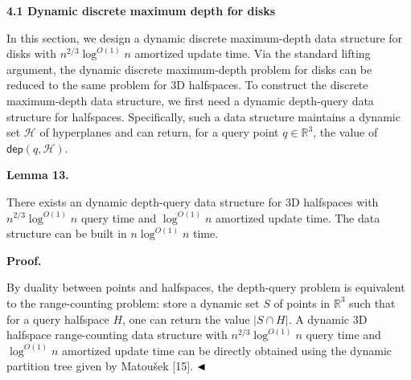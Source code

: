 \par
\par
\par\medskip\noindent\textbf{4.1 Dynamic discrete maximum depth for disks}\par
In this section, we design a dynamic discrete maximum-depth data structure for disks with $n^{2/3}\log^{O(1)}n$ amortized update time. Via the standard lifting argument, the dynamic discrete maximum-depth problem for disks can be reduced to the same problem for 3D halfspaces. To construct the discrete maximum-depth data structure, we first need a dynamic depth-query data structure for halfspaces. Specifically, such a data structure maintains a dynamic set $\mathcal{H}$ of hyperplanes and can return, for a query point $q\in\mathbb{R}^{3}$, the value of $\mathsf{dep}(q,\mathcal{H})$.
\par
\par
\par\medskip\noindent\textbf{Lemma 13.}\par
There exists an dynamic depth-query data structure for 3D halfspaces with $n^{2/3}\log^{O(1)}n$ query time and $\log^{O(1)}n$ amortized update time. The data structure can be built in $n\log^{O(1)}n$ time.
\par
\par
\par
\par\medskip\noindent\textbf{Proof.}\par
By duality between points and halfspaces, the depth-query problem is equivalent to the range-counting problem: store a dynamic set $S$ of points in $\mathbb{R}^{3}$ such that for a query halfspace $H$, one can return the value $|S\cap H|$. A dynamic 3D halfspace range-counting data structure with $n^{2/3}\log^{O(1)}n$ query time and $\log^{O(1)}n$ amortized update time can be directly obtained using the dynamic partition tree given by Matoušek [15]. $\hfill\blacktriangleleft$
\par
\par
